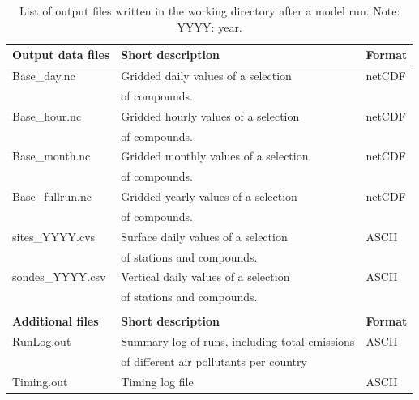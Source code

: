 \documentclass[a4paper,12pt]{report}
\begin{document}
\begin{table}[h!]
\caption[List of model output files]{List of output files written in the
  working directory after a  model run. 
Note: YYYY: year.}\label{tab:output}
\begin{center}
\hspace{-1cm}
\begin{tabular}{lll}
\hline
{\bf Output data files} &  {\bf Short description} & {\bf Format}\\
\hline
    Base\_day.nc & Gridded daily values of a selection & netCDF\\
&   of compounds.& \\ 
    Base\_hour.nc &Gridded hourly values of a selection &
    netCDF\\  
 &  of compounds.& \\
    Base\_month.nc & Gridded monthly values of a selection&
    netCDF\\
 &  of compounds.& \\
    Base\_fullrun.nc & Gridded yearly values of a selection&
    netCDF\\
 &  of compounds. & \\
    sites\_YYYY.cvs & Surface daily values of a selection&  ASCII\\
 & of stations and compounds.& \\
    sondes\_YYYY.csv & Vertical daily values of a selection& ASCII\\
 &  of stations and compounds. & \\
& &\\ \hline
{\bf Additional files} &  {\bf Short description} & {\bf Format}\\
    RunLog.out & Summary log of runs, including total emissions  & ASCII\\
 &  of different air pollutants per country& \\
Timing.out & Timing log file& ASCII \\
 
\hline
\end{tabular}
\end{center}

\label{Tab:outputs}
\end{table}
\end{document}
